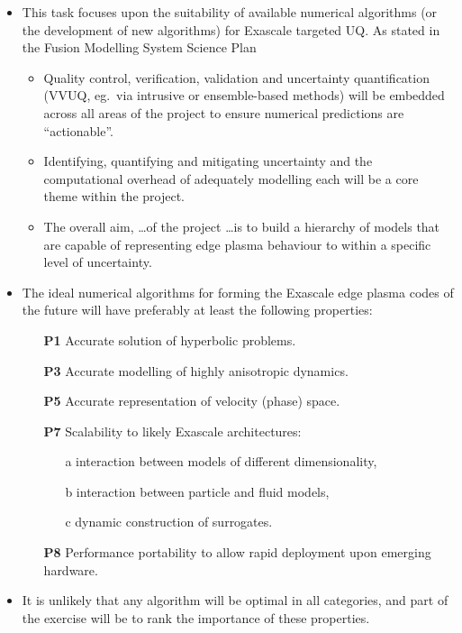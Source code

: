 \begin{itemize}
\item This task focuses upon the suitability of available numerical 
algorithms (or the development of new algorithms)
for Exascale targeted UQ. As stated in the Fusion Modelling System
Science Plan
\begin{itemize}
\item Quality control, verification, validation and uncertainty quantification
(VVUQ, eg.\ via intrusive or ensemble-based methods) will be embedded across all
areas of the project to ensure numerical predictions are ``actionable''. 
\item Identifying, quantifying and mitigating uncertainty and the
computational overhead of adequately modelling each will be a core theme within the project.
\item The overall aim, 
\ldots of the project \ldots is to build a hierarchy of models that are capable of
representing edge plasma behaviour to within a specific level of uncertainty.
\end{itemize}

\item The ideal numerical algorithms for forming the Exascale edge plasma codes of 
the future will have preferably at least the following properties:
\begin{itemize}
\item[{\bf P1}] Accurate solution of hyperbolic problems.
\item[{\bf P3}] Accurate modelling of highly anisotropic dynamics. 
\item[{\bf P5}] Accurate representation of velocity (phase) space.
\item[{\bf P7}] Scalability to likely Exascale architectures:
\begin{itemize}
\item[a] interaction between models of different dimensionality,
\item[b] interaction between particle and fluid models,
\item[c] dynamic construction of surrogates.
\end{itemize}
\item[{\bf P8}] Performance portability to allow rapid deployment upon emerging hardware.
\end{itemize}

\item It is unlikely that any algorithm will be optimal in all categories,
and part of the exercise
will be to rank the importance of these properties.
\end{itemize}


